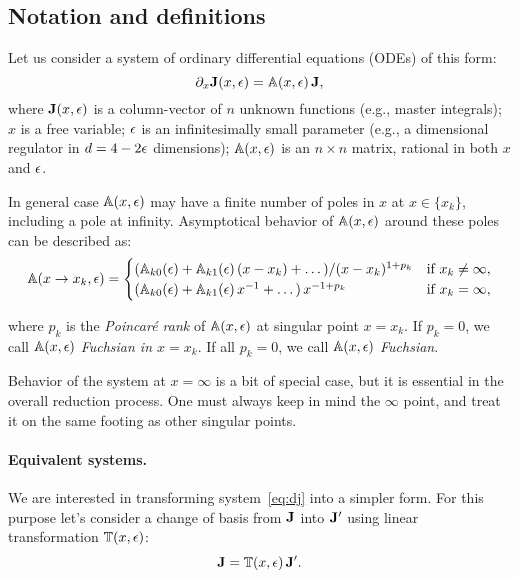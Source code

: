 \documentclass[12pt,a4paper]{article}
\begin{document}
\subsection{Notation and definitions}

Let us consider a system of ordinary differential equations (ODEs) of this form:
\begin{equation}
\label{eq:dj}
    \partial_x \mathbf{J}(x,\epsilon) = \mathbb{A}(x,\epsilon)\,\mathbf{J},
\end{equation}
where $\mathbf{J}(x,\epsilon)$ is a column-vector of $n$ unknown functions (e.g., master integrals);
$x$ is a free variable;
$\epsilon$ is an infinitesimally small parameter (e.g., a dimensional regulator in $d=4-2\epsilon$ dimensions);
$\mathbb{A}(x,\epsilon)$ is an $n \times n$ matrix, rational in both $x$ and $\epsilon$.

In general case $\mathbb{A}(x,\epsilon)$ may have a finite number of poles in $x$ at $x\in\{x_k\}$, including a pole at infinity.
Asymptotical behavior of $\mathbb{A}(x,\epsilon)$ around these poles can be described as:
\begin{equation}
\label{eq:axeps}
    \mathbb{A}(x \to x_k,\epsilon) =
    \begin{cases}
        (\mathbb{A}_{k0}(\epsilon) + \mathbb{A}_{k1}(\epsilon)\,(x - x_k) + \dots)/(x - x_k)^{1+p_k} & \text{if $x_k\neq\infty$}, \\
        (\mathbb{A}_{k0}(\epsilon) + \mathbb{A}_{k1}(\epsilon)\,x^{-1} + \dots)\,x^{-1 + p_k} & \text{if $x_k=\infty$},
    \end{cases}
\end{equation}

where $p_k$ is the \textit{Poincar\'e rank} of $\mathbb{A}(x,\epsilon)$ at singular point $x=x_k$.
If $p_k=0$, we call $\mathbb{A}(x,\epsilon)$ \textit{Fuchsian in $x=x_k$}.
If all $p_k=0$, we call $\mathbb{A}(x,\epsilon)$ \textit{Fuchsian}.

Behavior of the system at $x=\infty$ is a bit of special case, but it is essential in the overall reduction process.
One must always keep in mind the $\infty$ point, and treat it on the same footing as other singular points.

\paragraph{Equivalent systems.}
We are interested in transforming system~\eqref{eq:dj} into a simpler form.
For this purpose let's consider a change of basis from $\mathbf{J}$ into $\mathbf{J}'$ using linear transformation $\mathbb{T}(x,\epsilon)$:
\begin{equation}
  \mathbf{J} = \mathbb{T}(x,\epsilon)\, \mathbf{J}'.
\end{equation}
\end{document}
